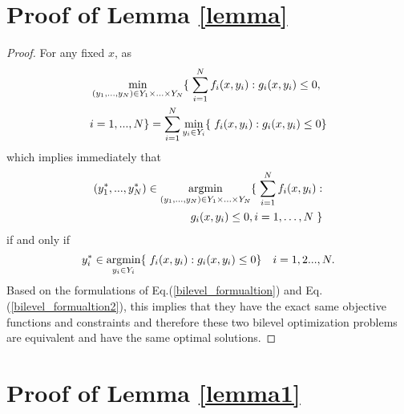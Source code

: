 \documentclass[10pt,journal]{IEEEtran}
\theoremstyle{definition}
\theoremstyle{plain} \newtheorem{theo}{Theorem} \newtheorem{prop}{Proposition}  \newtheorem{lemm}{Lemma}
\begin{document}
\section{Proof of Lemma \ref{lemma}} \label{appendix A}
\begin{proof}
For any fixed $x$, as 
\begin{align*}
\underset{(y_1,...,y_N) \in Y_1\times ...\times Y_N} {\operatorname{\min}} \lbrace \hspace{1mm} \sum_{i=1}^N f_i(x,y_i): g_i(x,y_i)\leq 0, \hspace{0.2cm} \\ i=  1,...,N \rbrace  = \sum_{i=1}^N \underset{y_i \in Y_i}{\operatorname{\min}} \lbrace \hspace{1mm} f_i(x,y_i):g_i(x,y_i)\leq 0\rbrace
\end{align*} 
which implies immediately that 
\begin{align*}
(y_1^*,...,y_N^*) \in \underset{(y_1,...,y_N) \in Y_1\times ...\times Y_N} {\operatorname{argmin}} \lbrace \hspace{1mm} \sum_{i=1}^N f_i(x,y_i): \\ g_i(x,y_i)\leq 0,  i=1,\dots,N \hspace{1mm} \rbrace
\end{align*} 
 if and only if \begin{align*}
  y_i^* \in \underset{y_i \in Y_i}{\operatorname{argmin}} \lbrace \hspace{1mm} f_i(x,y_i): g_i(x,y_i)\leq 0\rbrace \quad i=1,2...,N.
  \end{align*} 
Based on the formulations of Eq.(\ref{bilevel_formualtion}) and Eq.(\ref{bilevel_formualtion2}), this implies  that they have the exact same objective functions and constraints and therefore these two bilevel optimization problems are equivalent and have the same optimal solutions. 
\end{proof}




\section{Proof of Lemma \ref{lemma1}} \label{appendix B}
\end{document}
